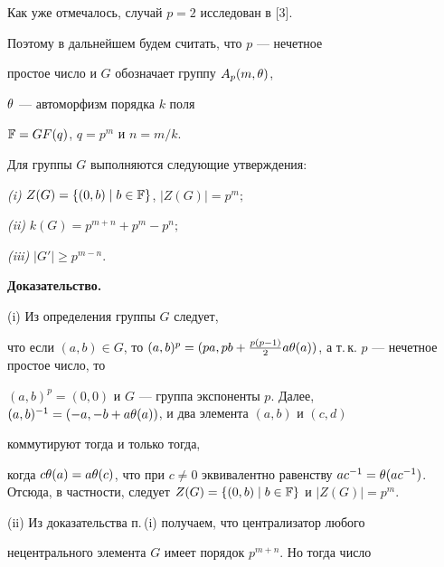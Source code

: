 Как уже отмечалось, случай $p=2$ исследован в [3]. 


Поэтому в дальнейшем будем считать, что $p$ --- нечетное 


простое число и $G$ обозначает группу $A_p(m,\theta)$,


$\theta$ --- автоморфизм порядка $k$ поля 


$\Bbb F=GF(q)$, $q=p^m$ и $n=m/k$.








\begin{lem}


Для группы $G$ выполняются следующие утверждения\/${:}$





{\em (i)} $Z(G)=\lbrace(0,b)\mid b\in\Bbb F\rbrace$, $|Z(G)|=p^m;$





{\em (ii)} $k(G)=p^{m+n}+p^m-p^n;$





{\em (iii)} $|G'|\ge p^{m-n}$.


\end{lem}








{\bf Доказательство.}


(i) Из определения группы $G$ следует,


что если $(a,b)\in G$, то $(a,b)^p=(pa,


pb+\frac{p(p-1)}{2}a\te(a))$, а т.\,к. $p$ --- нечетное простое число, то


$(a,b)^p=(0,0)$ и $G$ --- группа экспоненты $p$. Далее, $(a,b)^{-1}=(-a,


-b+a\te(a))$, и два элемента $(a,b)$ и $(c,d)$ 


коммутируют тогда и только тогда, 


когда $c\te(a)=a\te(c)$, что при $c\ne0$ эквивалентно равенству $ac^{-1}=


\te(ac^{-1})$. Отсюда, в частности, следует $Z(G)=\lbr(0,b)\mid b\in 


\F\rbr$ и $|Z(G)|=p^m$. 





(ii) Из доказательства п.\,(i) получаем, что централизатор любого 


нецентрального элемента $G$ имеет порядок $p^{m+n}$. Но тогда число 


